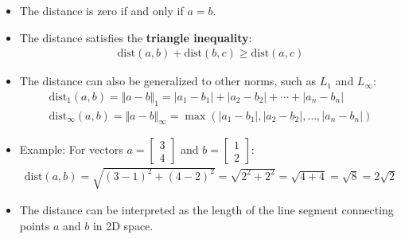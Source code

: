 \begin{frame}
    \begin{itemize}
        \item The distance is zero if and only if $a = b$.
        \item The distance satisfies the \textbf{triangle inequality}:
        \begin{align}
            \text{dist}(a, b) + \text{dist}(b, c) \geq \text{dist}(a, c)
        \end{align}
        \item The distance can also be generalized to other norms, such as $L_1$ and $L_\infty$:
        \begin{align}
            \text{dist}_1(a, b) = \Vert a - b \Vert_1 = |a_1 - b_1| + |a_2 - b_2| + \cdots + |a_n - b_n|\\
            \text{dist}_\infty(a, b) = \Vert a - b \Vert_\infty = \max(|a_1 - b_1|, |a_2 - b_2|, \ldots, |a_n - b_n|)
        \end{align}
    \end{itemize}
\end{frame}
\begin{frame}
\begin{itemize}
    \item Example: For vectors $a = \begin{bmatrix} 3 \\ 4 \end{bmatrix}$ and $b = \begin{bmatrix} 1 \\ 2 \end{bmatrix}$:
    \begin{align*}
        \text{dist}(a, b) = \sqrt{(3-1)^2 + (4-2)^2} = \sqrt{2^2 + 2^2} = \sqrt{4 + 4} = \sqrt{8} = 2\sqrt{2}
    \end{align*}
    \item The distance can be interpreted as the length of the line segment connecting points $a$ and $b$ in 2D space. 
\end{itemize}
\end{frame}

